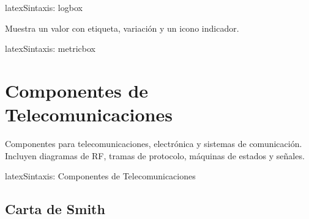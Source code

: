 \begin{codigosimple}{latex}{Sintaxis: logbox}
\begin{logbox}[Título]
\end{logbox}
\end{codigosimple}

\begin{logbox}
\end{logbox}

Muestra un valor con etiqueta, variación y un icono indicador.

\begin{codigosimple}{latex}{Sintaxis: metricbox}
\end{codigosimple}

\vspace{1em}
\noindent
{}
\hfill
{}
\hfill
{}


\section{Componentes de Telecomunicaciones}
\label{sec:comp-telecom}

Componentes para telecomunicaciones, electrónica y sistemas de comunicación.
Incluyen diagramas de RF, tramas de protocolo, máquinas de estados y señales.

\begin{codigosimple}{latex}{Sintaxis: Componentes de Telecomunicaciones}
\usepackage[telecom]{eps-componentes}
\end{codigosimple}

\subsection{Carta de Smith}
\label{subsec:smith}

